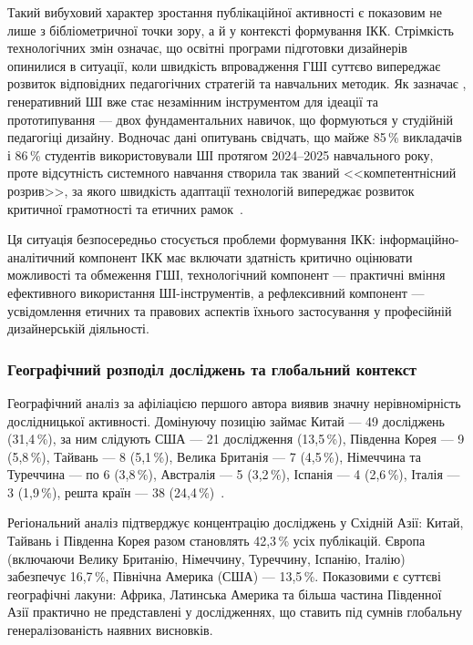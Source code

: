 Такий вибуховий характер зростання публікаційної активності є показовим не лише з бібліометричної точки зору, а й у контексті формування ІКК. Стрімкість технологічних змін означає, що освітні програми підготовки дизайнерів опинилися в ситуації, коли швидкість впровадження ГШІ суттєво випереджає розвиток відповідних педагогічних стратегій та навчальних методик. Як зазначає \citet{Fleischmann2024}, генеративний ШІ вже стає незамінним інструментом для ідеації та прототипування --- двох фундаментальних навичок, що формуються у студійній педагогіці дизайну. Водночас дані опитувань свідчать, що майже 85\,\% викладачів і 86\,\% студентів використовували ШІ протягом 2024--2025 навчального року, проте відсутність системного навчання створила так званий <<компетентнісний розрив>>, за якого швидкість адаптації технологій випереджає розвиток критичної грамотності та етичних рамок~\cite{Pudasaini2025}.

Ця ситуація безпосередньо стосується проблеми формування ІКК: інформаційно-аналітичний компонент ІКК має включати здатність критично оцінювати можливості та обмеження ГШІ, технологічний компонент --- практичні вміння ефективного використання ШІ-інструментів, а рефлексивний компонент --- усвідомлення етичних та правових аспектів їхнього застосування у професійній дизайнерській діяльності.

\subsubsection{Географічний розподіл досліджень та глобальний контекст}\label{sssec:1.2.2}

Географічний аналіз за афіліацією першого автора виявив значну нерівномірність дослідницької активності. Домінуючу позицію займає Китай --- 49 досліджень (31,4\,\%), за ним слідують США --- 21 дослідження (13,5\,\%), Південна Корея --- 9 (5,8\,\%), Тайвань --- 8 (5,1\,\%), Велика Британія --- 7 (4,5\,\%), Німеччина та Туреччина --- по 6 (3,8\,\%), Австралія --- 5 (3,2\,\%), Іспанія --- 4 (2,6\,\%), Італія --- 3 (1,9\,\%), решта країн --- 38 (24,4\,\%)~\cite{Musiienko2026ScopingReview}.

Регіональний аналіз підтверджує концентрацію досліджень у Східній Азії: Китай, Тайвань і Південна Корея разом становлять 42,3\,\% усіх публікацій. Європа (включаючи Велику Британію, Німеччину, Туреччину, Іспанію, Італію) забезпечує 16,7\,\%, Північна Америка (США) --- 13,5\,\%. Показовими є суттєві географічні лакуни: Африка, Латинська Америка та більша частина Південної Азії практично не представлені у дослідженнях, що ставить під сумнів глобальну генералізованість наявних висновків.

